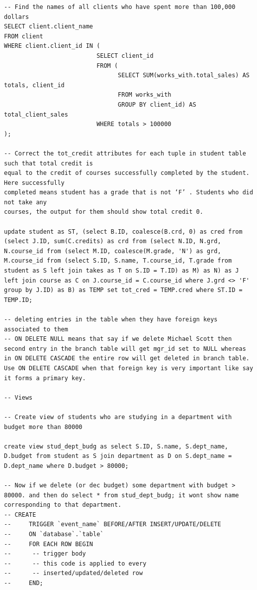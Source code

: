 \documentclass[8pt, a4paper, oneside, twocolumn]{extarticle}
\begin{document}
\begin{verbatim}
-- Find the names of all clients who have spent more than 100,000 dollars
SELECT client.client_name
FROM client
WHERE client.client_id IN (
                          SELECT client_id
                          FROM (
                                SELECT SUM(works_with.total_sales) AS totals, client_id
                                FROM works_with
                                GROUP BY client_id) AS total_client_sales
                          WHERE totals > 100000
);

-- Correct the tot_credit attributes for each tuple in student table such that total credit is
equal to the credit of courses successfully completed by the student. Here successfully
completed means student has a grade that is not ‘F’ . Students who did not take any
courses, the output for them should show total credit 0.

update student as ST, (select B.ID, coalesce(B.crd, 0) as cred from (select J.ID, sum(C.credits) as crd from (select N.ID, N.grd, N.course_id from (select M.ID, coalesce(M.grade, 'N') as grd, M.course_id from (select S.ID, S.name, T.course_id, T.grade from student as S left join takes as T on S.ID = T.ID) as M) as N) as J left join course as C on J.course_id = C.course_id where J.grd <> 'F' group by J.ID) as B) as TEMP set tot_cred = TEMP.cred where ST.ID = TEMP.ID;

-- deleting entries in the table when they have foreign keys associated to them
-- ON DELETE NULL means that say if we delete Michael Scott then second entry in the branch table will get mgr_id set to NULL whereas in ON DELETE CASCADE the entire row will get deleted in branch table. Use ON DELETE CASCADE when that foreign key is very important like say it forms a primary key.

-- Views

-- Create view of students who are studying in a department with budget more than 80000

create view stud_dept_budg as select S.ID, S.name, S.dept_name, D.budget from student as S join department as D on S.dept_name = D.dept_name where D.budget > 80000;

-- Now if we delete (or dec budget) some department with budget > 80000. and then do select * from stud_dept_budg; it wont show name corresponding to that department.
-- CREATE
--     TRIGGER `event_name` BEFORE/AFTER INSERT/UPDATE/DELETE
--     ON `database`.`table`
--     FOR EACH ROW BEGIN
-- 		-- trigger body
-- 		-- this code is applied to every
-- 		-- inserted/updated/deleted row
--     END;


\end{verbatim}
\end{document}
